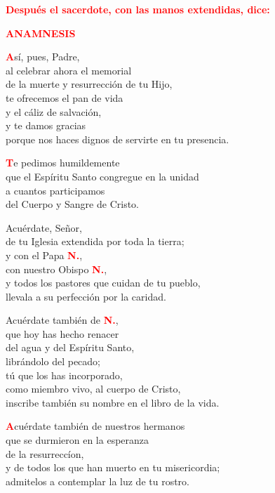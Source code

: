 \documentclass[12pt, letterpaper]{report}
\begin{document}
\large{\bfseries \textcolor{red}{Despu\'es el sacerdote, con las manos extendidas, dice:}} \newline


\Large {\bfseries \textcolor{red}{ANAMNESIS}}

\lettrine[lines=1]{\bfseries \textcolor{red}{A}}{}\Large s\'i, pues, Padre,\\
al celebrar ahora el memorial\\
de la muerte y resurrecci\'on de tu Hijo,\\
te ofrecemos el pan de vida \\
y el c\'aliz de salvaci\'on,\\
y te damos gracias\\
porque nos haces dignos de servirte en tu presencia.

\lettrine[lines=1]{\bfseries \textcolor{red}{T}}{}\Large e pedimos humildemente\\
que el Esp\'iritu Santo congregue en la unidad\\
a cuantos participamos\\
del Cuerpo y Sangre de Cristo.\newline

Acu\'erdate, Se\~nor,\\
de tu Iglesia extendida por toda la tierra; \\
y con el Papa {\bfseries \textcolor{red}{N.}},\\
con nuestro Obispo {\bfseries \textcolor{red}{N.}},\\
y todos los pastores que cuidan de tu pueblo,\\
llevala a su perfecci\'on por la caridad.\newline

Acu\'erdate tambi\'en de {\bfseries \textcolor{red}{N.}},\\
que hoy has hecho renacer \\
del agua y del Esp\'iritu Santo, \\
libr\'andolo del pecado; \\
t\'u que los has incorporado, \\
como miembro vivo, al cuerpo de Cristo, \\
inscribe tambi\'en su nombre en el libro de la vida.

\lettrine[lines=1]{\bfseries \textcolor{red}{A}}{}\Large cu\'erdate tambi\'en de nuestros hermanos\\
que se durmieron en la esperanza\\
de la resurrecc\'ion,\\
y de todos los que han muerto en tu misericordia;\\
admitelos a contemplar la luz de tu rostro.\newline
\end{document}
